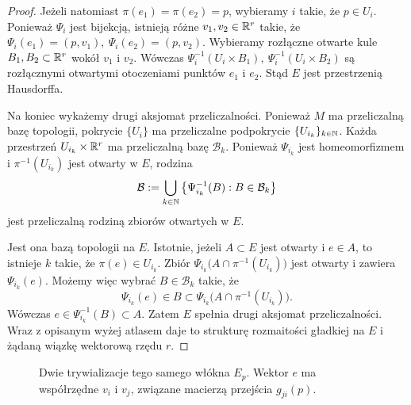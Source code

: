 \begin{proof}
Jeżeli natomiast $\pi(e_1)=\pi(e_2)=p$,
wybieramy $i$ takie, że $p\in U_i$.
Ponieważ $\Psi_i$ jest bijekcją, istnieją różne
$v_1,v_2\in\mathbb{R}^r$ takie, że $\Psi_i(e_1)=(p,v_1), \ \Psi_i(e_2)=(p,v_2)$.
Wybieramy rozłączne otwarte kule
$B_1,B_2\subset\mathbb{R}^r$ wokół $v_1$ i $v_2$.
Wówczas $\Psi_i^{-1}(U_i\times B_1), \ \Psi_i^{-1}(U_i\times B_2)$
są rozłącznymi otwartymi otoczeniami
punktów $e_1$ i $e_2$.
Stąd $E$ jest przestrzenią Hausdorffa.

Na koniec wykażemy drugi aksjomat przeliczalności.
Ponieważ $M$ ma przeliczalną bazę topologii,
pokrycie $\{U_i\}$ ma przeliczalne podpokrycie
$\{U_{i_k}\}_{k\in\mathbb{N}}$.
Każda przestrzeń $U_{i_k}\times\mathbb{R}^r$ ma
przeliczalną bazę $\mathcal B_k$.
Ponieważ $\Psi_{i_k}$ jest homeomorfizmem
i $\pi^{-1}(U_{i_k})$ jest otwarty w $E$,
rodzina
\[
\mathcal B:=
\bigcup_{k\in\mathbb{N}}
\left\{
\Psi_{i_k}^{-1}(B):B\in\mathcal B_k
\right\}
\]
jest przeliczalną rodziną zbiorów otwartych w $E$.

Jest ona bazą topologii na $E$. Istotnie, jeżeli
$A\subset E$ jest otwarty i $e\in A$, to istnieje
$k$ takie, że $\pi(e)\in U_{i_k}$.
Zbiór $\Psi_{i_k}\bigl( A\cap\pi^{-1}(U_{i_k}) \bigr)$
jest otwarty i zawiera $\Psi_{i_k}(e)$.
Możemy więc wybrać $B\in\mathcal B_k$ takie, że
\[
\Psi_{i_k}(e)\in B
\subset
\Psi_{i_k}\bigl(
A\cap\pi^{-1}(U_{i_k})
\bigr).
\]
Wówczas $e\in\Psi_{i_k}^{-1}(B)\subset A$.
Zatem $E$ spełnia drugi aksjomat przeliczalności.
Wraz z opisanym wyżej atlasem daje to strukturę
rozmaitości gładkiej na $E$ i żądaną wiązkę wektorową
rzędu $r$.
\end{proof}


\begin{figure}[ht]
\centering
{}
\caption{Dwie trywializacje tego samego włókna $E_p$. Wektor $e$ ma współrzędne $v_i$ i $v_j$, związane macierzą przejścia $g_{ji}(p)$.}
\end{figure}

